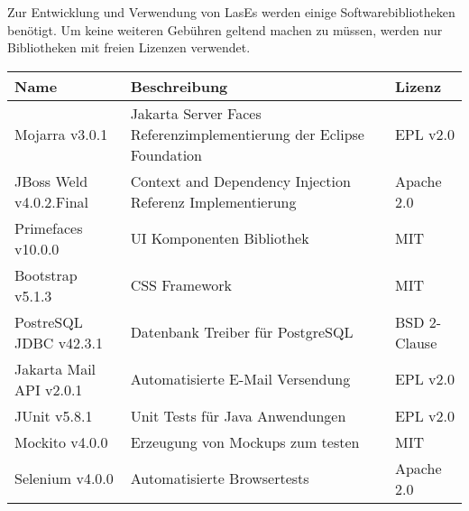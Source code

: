 
Zur Entwicklung und Verwendung von LasEs werden einige Softwarebibliotheken benötigt. Um keine weiteren Gebühren geltend machen zu müssen, werden nur Bibliotheken mit freien Lizenzen verwendet.

\begin{table}[H]
	\centering
	\begin{tabularx}{\columnwidth}{|l|X|l|}
		\hline
		Name & Beschreibung & Lizenz \\
		\hline\hline
		Mojarra v3.0.1 & Jakarta Server Faces Referenzimplementierung der Eclipse Foundation & EPL v2.0 \\
		\hline
		JBoss Weld v4.0.2.Final & Context and Dependency Injection Referenz Implementierung & Apache 2.0 \\
		\hline
		Primefaces v10.0.0 & UI Komponenten Bibliothek & MIT \\
		\hline
		Bootstrap v5.1.3 & CSS Framework & MIT \\
		\hline
		PostreSQL JDBC v42.3.1 & Datenbank Treiber für PostgreSQL & BSD 2-Clause \\
		\hline
		Jakarta Mail API v2.0.1 & Automatisierte E-Mail Versendung & EPL v2.0 \\
		\hline
		JUnit v5.8.1 & Unit Tests für Java Anwendungen & EPL v2.0 \\
		\hline
		Mockito v4.0.0 & Erzeugung von Mockups zum testen & MIT \\
		\hline
		Selenium v4.0.0 & Automatisierte Browsertests & Apache 2.0 \\
		\hline



	\end{tabularx}
\end{table}